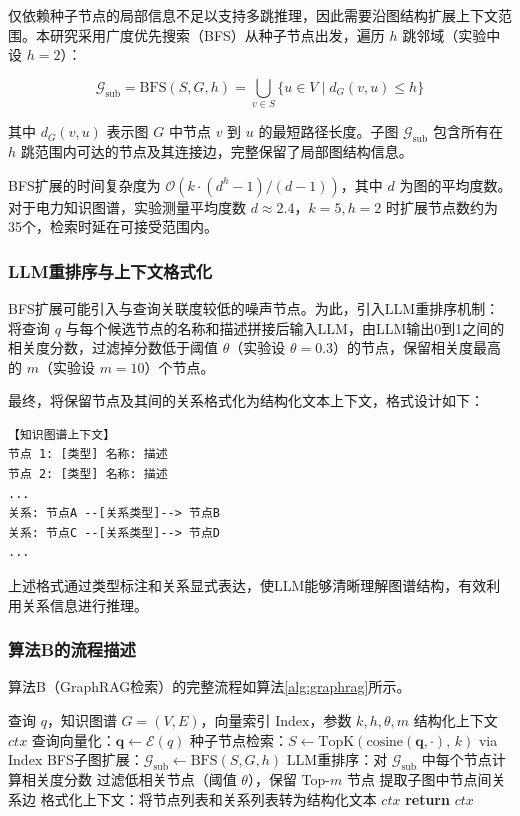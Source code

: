 仅依赖种子节点的局部信息不足以支持多跳推理，因此需要沿图结构扩展上下文范围。本研究采用广度优先搜索（BFS）从种子节点出发，遍历 $h$ 跳邻域（实验中设 $h=2$）：

\begin{equation}
\mathcal{G}_{\text{sub}} = \text{BFS}(S, G, h) = \bigcup_{v \in S} \{u \in V \mid d_G(v, u) \leq h\}
\end{equation}

其中 $d_G(v, u)$ 表示图 $G$ 中节点 $v$ 到 $u$ 的最短路径长度。子图 $\mathcal{G}_{\text{sub}}$ 包含所有在 $h$ 跳范围内可达的节点及其连接边，完整保留了局部图结构信息。

BFS扩展的时间复杂度为 $\mathcal{O}(k \cdot (d^h - 1)/(d-1))$，其中 $d$ 为图的平均度数。对于电力知识图谱，实验测量平均度数 $d \approx 2.4$，$k=5, h=2$ 时扩展节点数约为35个，检索时延在可接受范围内。

\subsubsection{LLM重排序与上下文格式化}

BFS扩展可能引入与查询关联度较低的噪声节点。为此，引入LLM重排序机制：将查询 $q$ 与每个候选节点的名称和描述拼接后输入LLM，由LLM输出0到1之间的相关度分数，过滤掉分数低于阈值 $\theta$（实验设 $\theta=0.3$）的节点，保留相关度最高的 $m$（实验设 $m=10$）个节点。

最终，将保留节点及其间的关系格式化为结构化文本上下文，格式设计如下：

\begin{verbatim}
【知识图谱上下文】
节点 1: [类型] 名称: 描述
节点 2: [类型] 名称: 描述
...
关系: 节点A --[关系类型]--> 节点B
关系: 节点C --[关系类型]--> 节点D
...
\end{verbatim}

上述格式通过类型标注和关系显式表达，使LLM能够清晰理解图谱结构，有效利用关系信息进行推理。

\subsubsection{算法B的流程描述}

算法B（GraphRAG检索）的完整流程如算法\ref{alg:graphrag}所示。

\begin{algorithm}[H]
\caption{GraphRAG子图扩展检索算法（算法B）}
\label{alg:graphrag}
\begin{algorithmic}[1]
\Require 查询 $q$，知识图谱 $G=(V,E)$，向量索引 $\mathrm{Index}$，参数 $k, h, \theta, m$
\Ensure 结构化上下文 $ctx$
\State 查询向量化：$\mathbf{q} \gets \mathcal{E}(q)$
\State 种子节点检索：$S \gets \mathrm{TopK}(\mathrm{cosine}(\mathbf{q}, \cdot),\, k)$ via $\mathrm{Index}$
\State BFS子图扩展：$\mathcal{G}_{\mathrm{sub}} \gets \mathrm{BFS}(S, G, h)$
\State LLM重排序：对 $\mathcal{G}_{\mathrm{sub}}$ 中每个节点计算相关度分数
\State 过滤低相关节点（阈值 $\theta$），保留 Top-$m$ 节点
\State 提取子图中节点间关系边
\State 格式化上下文：将节点列表和关系列表转为结构化文本 $ctx$
\State \textbf{return} $ctx$
\end{algorithmic}
\end{algorithm}

